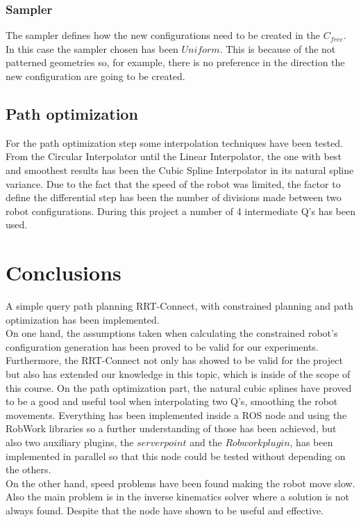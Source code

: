 	\subsubsection{Sampler} %
	\label{sub:sampler}
	The sampler defines how the new configurations need to be created in the $C_{free}$. In this case the sampler chosen has been $Uniform$. This is because of the not patterned geometries so, for example, there is no preference in the direction the new configuration are going to be created.
\subsection{Path optimization} %
\label{sub:path_optimization_implementation}
For the path optimization step some interpolation techniques have been tested. 
From the Circular Interpolator until the Linear Interpolator, the one with best and smoothest results has been the Cubic Spline Interpolator in its natural spline variance.
Due to the fact that the speed of the robot was limited, the factor to define the differential step has been the number of divisions made between two robot configurations. 
During this project a number of 4 intermediate Q's has been used.


\section{Conclusions} %
\label{sec:conclusions_pathplanning}
A simple query path planning RRT-Connect, with constrained planning and path optimization has been implemented. \\

On one hand, the assumptions taken when calculating the constrained robot's configuration generation has been proved to be valid for our experiments. 
Furthermore, the RRT-Connect not only has showed to be valid for the project but also has extended our knowledge in this topic, which is inside of the scope of this course.
On the path optimization part, the natural cubic splines have proved to be a good and useful tool when interpolating two Q's, smoothing the robot movements. Everything has been implemented inside a ROS node and using the RobWork libraries so a further understanding of those has been achieved, but also two auxiliary plugins, the $server point$ and the $Robwork plugin$, has been implemented in parallel so that this node could be tested without depending on the others.\\

On the other hand, speed problems have been found making the robot move slow. Also the main problem is in the inverse kinematics solver where a solution is not always found. Despite that the node have shown to be useful and effective.

